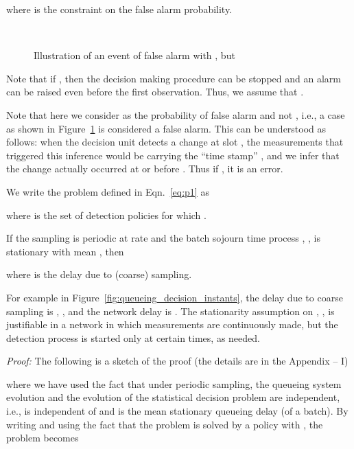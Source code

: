 \documentclass[acmtosn]{acmtrans2m}
\begin{document}
where  is the constraint on the false alarm probability.
 \begin{figure}[h]
   \centering \ 
   \caption{ Illustration of an event of false alarm with
    , but }
   \label{fig:falsealarm}
 \end{figure}
\begin{remarks}
Note that if , then the decision making procedure 
can be stopped and an alarm can be raised even before the first observation.
Thus, we assume that .
\end{remarks}

\begin{remarks}
Note that here we consider  as the probability
of false alarm and not , i.e., a case as shown
in Figure~\ref{fig:falsealarm} is considered a false alarm. This can be
understood as follows: when the decision unit detects a change at slot
, the measurements that triggered this inference would be
carrying the ``time stamp'' , and we infer that the
change actually occurred at or before . Thus if
, it is an error.   
\end{remarks}

We write the problem defined in Eqn.~\ref{eq:p1} as	

where  is the set of detection policies for which
.


\begin{theorem}
\label{thm:decoupling}
If the sampling is periodic at rate  and the batch sojourn time 
process , , is stationary with mean , then

where   is the delay due to (coarse) sampling.
\end{theorem}

\begin{remarks}
  For example in Figure~\ref{fig:queueing_decision_instants}, the
  delay due to coarse sampling is , , and
  the network delay is .  The stationarity assumption on
  , , is justifiable in a network in which measurements
  are continuously made, but the detection process is started only at
  certain times, as needed. 
\end{remarks}

\emph{Proof:} The following is a sketch of the
  proof (the details are in the Appendix -- I)

where we have used the fact that under periodic sampling, the queueing
system evolution and the evolution of the statistical decision problem
are independent, i.e.,  is independent of  and  is the mean stationary queueing delay (of a batch).  By
writing  and using the fact that the problem
 is solved by a policy
 with , the
problem becomes
\end{document}
